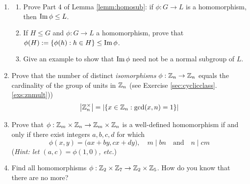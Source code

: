 \begin{exercises}
\begin{enumerate}
			
% 			
% 		
% 		
	
	
		\item\begin{enumerate}
		  \item Prove Part 4 of Lemma \ref{lemm:homosub}: if $\phi:G\to L$ is a homomorphism, then $\operatorname{Im}\phi\le L$.
		 	\item If $H\le G$ and $\phi:G\to L$ a homomorphism, prove that $\phi(H):=\{\phi(h):h\in H\}\le\operatorname{Im}\phi$.
		  \item Give an example to show that $\operatorname{Im}\phi$ need not be a normal subgroup of $L$.
		\end{enumerate}
	
		
		\item\label{exs:totient} Prove that the number of distinct \emph{isomorphisms} $\phi:\mathbb{Z}_n\to\mathbb{Z}_n$ equals the cardinality of the group of units in $\mathbb{Z}_n$ (see Exercise \ref*{sec:cyclicclass}.\ref{exs:znmult}))
		\[
			\left| \mathbb{Z}_n^\times\right|=\left| \{x\in\mathbb{Z}_n:\gcd(x,n)=1\}\right|
		\]
			
			  
	  \item Prove that $\phi:\mathbb{Z}_m\times\mathbb{Z}_n\to\mathbb{Z}_m\times\mathbb{Z}_n$ is a well-defined homomorphism if and only if there exist integers $a,b,c,d$ for which
	  \[
	  	\phi(x,y)=\bigl(ax+by,cx+dy\bigr),\quad 
	  	m\mid bn\quad
	  	\text{and}\quad n\mid cm
	  \]
	  (\emph{Hint: let $(a,c)=\phi(1,0)$, etc.})
	  
	
		\item Find all homomorphisms $\phi:\mathbb{Z}_2\times\mathbb{Z}_7\to\mathbb{Z}_2\times\mathbb{Z}_5$. How do you know that there are no more?
		
% 		  
		
	\end{enumerate}
\end{exercises}


